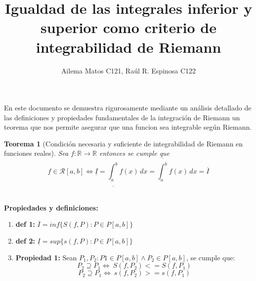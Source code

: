 \documentclass{article}
\title{Igualdad de las integrales inferior y superior como criterio de integrabilidad de Riemann}
\author{
Ailema Matos C121,
Raúl R. Espinosa C122 
}
\newtheorem{theorem}{Teorema}
\begin{document}
\maketitle

\section*{}

En este documento se demuestra rigurosamente mediante un análisis detallado de las definiciones y propiedades fundamentales de la integración de Riemann 
un teorema que nos permite asegurar que una funcion sea integrable según Riemann.\\

\begin{theorem}[Condición necesaria y suficiente de integrabilidad de Riemann en funciones reales]
Sea \( f: \mathbb{R} \to \mathbb{R} \) entonces se cumple que \[f \in \mathcal{R}[a, b] \Longleftrightarrow \underline{I} = \underline{\int_a^b} f(x) \, dx = \overline{\int_a^b} f(x) \, dx = \overline{I}\]\\
\end{theorem}

\textbf{Propiedades y definiciones:}

\begin{enumerate}
    \item \textbf{def 1:}  \(\overline{I} = inf \{ S(f, P): P \in P[a, b] \} \)  
    \item \textbf{def 2:}  \(\underline{I} = sup\{ s(f, P): P \in P[a, b] \} \)
    \item \textbf{Propiedad 1:} Sean \(P_1, P_2:  P1 \in P[a, b] \wedge P_2 \in P[a,b] \), se cumple que:
    \[
    P_2 \supseteq P_1  \Longleftrightarrow\ S(f, P_2) <= S(f, P_1)
    \]
    \[
    P_2 \supseteq P_1\Longleftrightarrow\ s(f, P_2) >= s(f, P_1)
    \]
\end{enumerate} 
\end{document}
